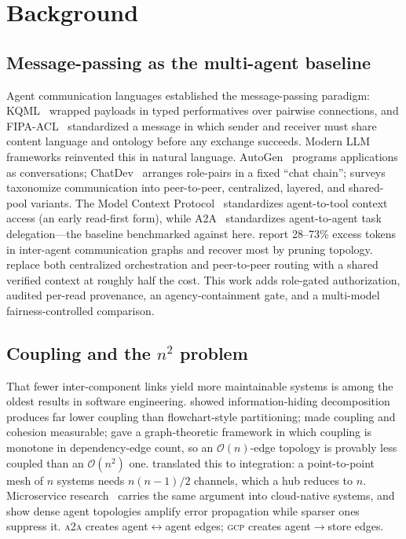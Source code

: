 \documentclass[conference,letterpaper]{IEEEtran}
\newcommand{\gcp}{\textsc{gcp}}
\newcommand{\ata}{\textsc{a2a}}
\newcommand{\bigoh}{\mathcal{O}}
\begin{document}
\section{Background}
\label{sec:related}

\subsection{Message-passing as the multi-agent baseline}
Agent communication languages established the message-passing paradigm: KQML~\citep{finin1994}
wrapped payloads in typed performatives over pairwise connections, and FIPA-ACL~\citep{fipa2002}
standardized a message in which sender and receiver must share content language and ontology before
any exchange succeeds. Modern LLM frameworks reinvented this in natural language.
AutoGen~\citep{wu2023autogen} programs applications as conversations; ChatDev~\citep{qian2024chatdev}
arranges role-pairs in a fixed ``chat chain''; surveys~\citep{guo2024survey} taxonomize communication
into peer-to-peer, centralized, layered, and shared-pool variants. The Model Context
Protocol~\citep{mcp2024} standardizes agent-to-tool context access (an early read-first form), while
A2A~\citep{a2a2025} standardizes agent-to-agent task delegation---the baseline benchmarked against
here. \citet{zhang2024agentprune} report 28--73\% excess tokens in inter-agent communication graphs
and recover most by pruning topology. \citet{mao2026delm} replace both centralized orchestration and
peer-to-peer routing with a shared verified context at roughly half the cost. This work adds
role-gated authorization, audited per-read provenance, an agency-containment gate, and a
multi-model fairness-controlled comparison.

\subsection{Coupling and the $n^2$ problem}
That fewer inter-component links yield more maintainable systems is among the oldest results in
software engineering. \citet{parnas1972} showed information-hiding decomposition produces far lower
coupling than flowchart-style partitioning; \citet{stevens1974} made coupling and cohesion
measurable; \citet{briand1999} gave a graph-theoretic framework in which coupling is monotone in
dependency-edge count, so an $\bigoh(n)$-edge topology is provably less coupled than an
$\bigoh(n^2)$ one. \citet{hohpe2003} translated this to integration: a point-to-point mesh of $n$
systems needs $n(n{-}1)/2$ channels, which a hub reduces to $n$. Microservice
research~\citep{panichella2021} carries the same argument into cloud-native systems, and
\citet{shen2025topology} show dense agent topologies amplify error propagation while sparser ones
suppress it. \ata{} creates agent$\leftrightarrow$agent edges; \gcp{} creates agent$\rightarrow$store
edges.
\end{document}
